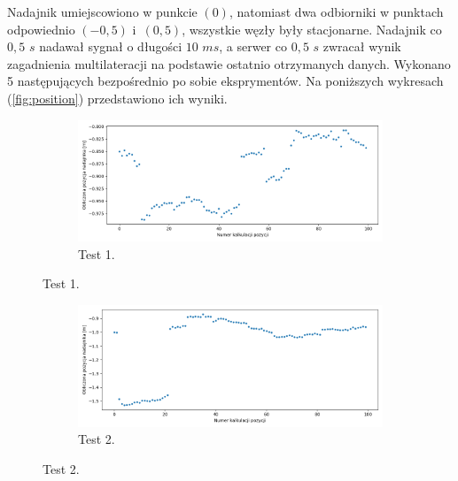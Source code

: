 Nadajnik umiejscowiono w punkcie $(0)$, natomiast dwa odbiorniki w punktach odpowiednio $(-0,5)$ i~$(0,5)$, wszystkie węzły były stacjonarne. Nadajnik co $0,5$ $s$ nadawał sygnał o długości $10$ $ms$, a serwer co $0,5$ $s$ zwracał wynik zagadnienia multilateracji na podstawie ostatnio otrzymanych danych. Wykonano 5 następujących bezpośrednio po sobie eksprymentów. Na poniższych wykresach (\ref{fig:position}) przedstawiono ich wyniki.

\begin{figure}[H]
    \centering
    \begin{subfigure}{\textwidth}\label{fig:position_0}
        \centering
        \includegraphics[width=0.95\linewidth]{pics/position/position_0.png}
        \caption{Test 1.}
    \end{subfigure}
\end{figure}
\begin{figure}[H]
    \ContinuedFloat\centering
    \begin{subfigure}{\textwidth}\label{fig:position_1}
        \centering
        \includegraphics[width=0.95\linewidth]{pics/position/position_1.png}
        \caption{Test 2.}
    \end{subfigure}
\end{figure}
